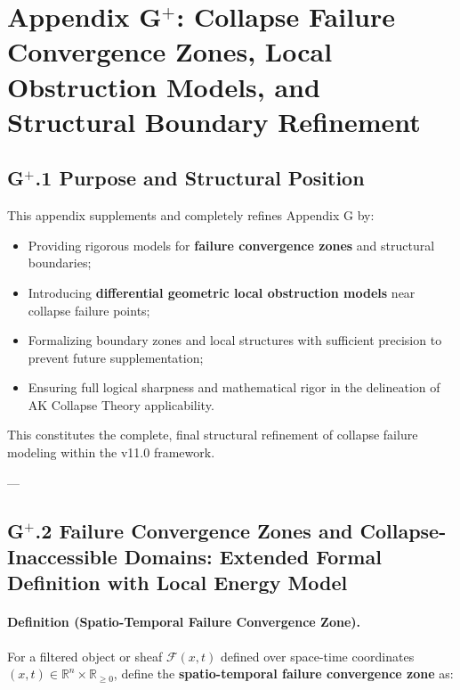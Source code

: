 \documentclass[11pt]{article}
\begin{document}
\section*{Appendix G$^{+}$: Collapse Failure Convergence Zones, Local Obstruction Models, and Structural Boundary Refinement}

\subsection*{G$^{+}$.1 Purpose and Structural Position}

This appendix supplements and completely refines Appendix G by:

\begin{itemize}
    \item Providing rigorous models for \textbf{failure convergence zones} and structural boundaries;
    \item Introducing \textbf{differential geometric local obstruction models} near collapse failure points;
    \item Formalizing boundary zones and local structures with sufficient precision to prevent future supplementation;
    \item Ensuring full logical sharpness and mathematical rigor in the delineation of AK Collapse Theory applicability.
\end{itemize}

This constitutes the complete, final structural refinement of collapse failure modeling within the v11.0 framework.

---

\subsection*{G$^{+}$.2 Failure Convergence Zones and Collapse-Inaccessible Domains: Extended Formal Definition with Local Energy Model}

\paragraph{Definition (Spatio-Temporal Failure Convergence Zone).}

For a filtered object or sheaf $\mathcal{F}(x,t)$ defined over space-time coordinates $(x,t) \in \mathbb{R}^n \times \mathbb{R}_{\geq 0}$, define the \textbf{spatio-temporal failure convergence zone} as:
\end{document}
